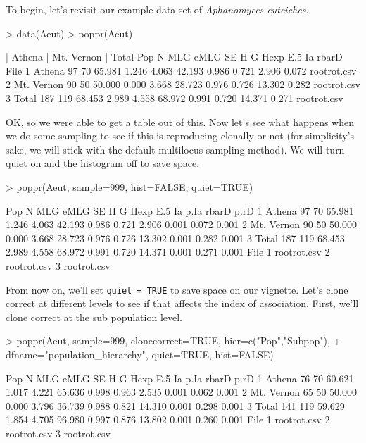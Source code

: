 \documentclass[letterpaper]{article}
\begin{document}
To begin, let's revisit our example data set of \textit{Aphanomyces euteiches}. \cite{Grunwald:2006}
\begin{Schunk}
\begin{Sinput}
> data(Aeut)
> poppr(Aeut)
\end{Sinput}
\begin{Soutput}
| Athena 
| Mt. Vernon 
| Total 
         Pop   N MLG   eMLG    SE     H      G  Hexp   E.5     Ia rbarD        File
1     Athena  97  70 65.981 1.246 4.063 42.193 0.986 0.721  2.906 0.072 rootrot.csv
2 Mt. Vernon  90  50 50.000 0.000 3.668 28.723 0.976 0.726 13.302 0.282 rootrot.csv
3      Total 187 119 68.453 2.989 4.558 68.972 0.991 0.720 14.371 0.271 rootrot.csv
\end{Soutput}
\end{Schunk}
OK, so we were able to get a table out of this. Now let's see what happens when we do some sampling to see if this is reproducing clonally or not (for simplicity's sake, we will stick with the default multilocus sampling method). We will turn quiet on and the histogram off to save space.
\begin{Schunk}
\begin{Sinput}
> poppr(Aeut, sample=999, hist=FALSE, quiet=TRUE)
\end{Sinput}
\end{Schunk}
\begin{Schunk}
\begin{Soutput}
         Pop   N MLG   eMLG    SE     H      G  Hexp   E.5     Ia  p.Ia rbarD  p.rD
1     Athena  97  70 65.981 1.246 4.063 42.193 0.986 0.721  2.906 0.001 0.072 0.001
2 Mt. Vernon  90  50 50.000 0.000 3.668 28.723 0.976 0.726 13.302 0.001 0.282 0.001
3      Total 187 119 68.453 2.989 4.558 68.972 0.991 0.720 14.371 0.001 0.271 0.001
         File
1 rootrot.csv
2 rootrot.csv
3 rootrot.csv
\end{Soutput}
\end{Schunk}
From now on, we'll set \texttt{quiet = TRUE} to save space on our vignette. Let's clone correct at different levels to see if that affects the index of association. First, we'll clone correct at the sub population level.
\begin{Schunk}
\begin{Sinput}
> poppr(Aeut, sample=999, clonecorrect=TRUE, hier=c("Pop","Subpop"), 
+       dfname="population_hierarchy", quiet=TRUE, hist=FALSE)
\end{Sinput}
\end{Schunk}
\begin{Schunk}
\begin{Soutput}
         Pop   N MLG   eMLG    SE     H      G  Hexp   E.5     Ia  p.Ia rbarD  p.rD
1     Athena  76  70 60.621 1.017 4.221 65.636 0.998 0.963  2.535 0.001 0.062 0.001
2 Mt. Vernon  65  50 50.000 0.000 3.796 36.739 0.988 0.821 14.310 0.001 0.298 0.001
3      Total 141 119 59.629 1.854 4.705 96.980 0.997 0.876 13.802 0.001 0.260 0.001
         File
1 rootrot.csv
2 rootrot.csv
3 rootrot.csv
\end{Soutput}
\end{Schunk}
\end{document}
